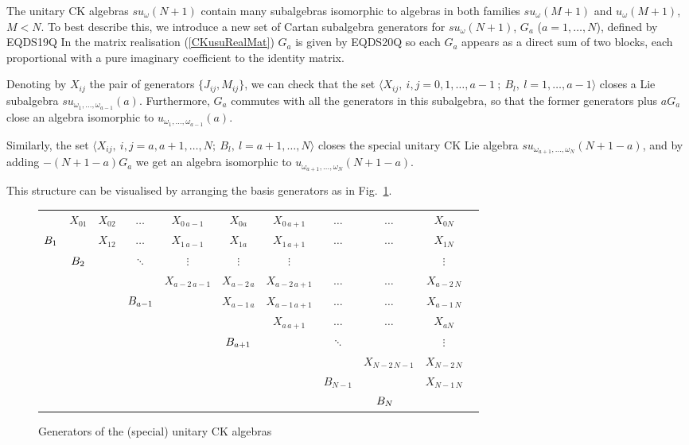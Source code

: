 \documentclass[12pt]{article}
\begin{document}
The  unitary CK algebras $su_{\omega}(N+1)$ contain many subalgebras
isomorphic to algebras in both families $su_{\omega}(M+1)$ and
$u_{\omega}(M+1)$, $M<N$. To best describe this,  we introduce a new set
of Cartan subalgebra generators for $su_{\omega}(N+1)$,
${G}_a$ ($a=1,\dots,N$), defined by
EQDS19Q
In the matrix realisation (\ref{CKusuRealMat}) ${G}_a$ is given by
EQDS20Q
so each ${G}_a$ appears as a direct sum of two blocks,
each proportional with a pure imaginary coefficient to the identity matrix.

Denoting by ${X}_{ij}$ the pair of generators
$\{{J}_{ij},{M}_{ij}\}$, we can check that the set $\langle
{X}_{ij},\ i,j=0,1,\dots,a-1\ ;\ {B}_l,\ l=1,\dots,a-1\rangle$
closes a Lie subalgebra
$su_{{\omega}_1,\dots,{\omega}_{a-1}}(a)$.
Furthermore,
${G}_a$ commutes with all the generators in this subalgebra, so that
the former generators plus $a{G}_a$ close an algebra isomorphic to
$u_{{\omega}_1,\dots,{\omega}_{a-1}}(a)$.

Similarly, the set $\langle {X}_{ij},\ i,j=a,a+1,\dots,N;\ {B}_l,\
l=a+1,\dots,N \rangle$ closes the  special unitary CK Lie algebra
$su_{{\omega}_{a+1},\dots,{\omega}_N}(N+1-a)$, and by adding $-(N+1-a){G}_a$ we
get an algebra isomorphic to $u_{{\omega}_{a+1},\dots,{\omega}_N}(N+1-a)$.

This structure can be visualised by arranging the basis generators
as in Fig.~\ref{fig2.1}.

\begin{figure}[ht]
\begin{center}
\begin{tabular}{ccccc|cccccc}
& ${X}_{01} $&$ {X}_{02} $&$\ldots$&${X}_{0\, a-1} $&
   ${X}_{0a}$&${X}_{0\, a+1}$&$\ldots$&$\ldots$&${X}_{0N}$\\
$\hfill {B}_{1} $ && $ {X}_{12} $&$\ldots$&${X}_{1\, a-1} $&
   ${X}_{1a}$&${X}_{1\, a+1}$& $\ldots$&$\ldots$&${X}_{1N}$\\
& $\hfill {B}_{2} $ &$  $&$\ddots $&$\vdots$&
   $\vdots$&$\vdots$&$ $&&$\vdots$\\
& &$ $&$ $&${X}_{a-2\,a-1}$&  ${X}_{a-2\,a}$&${X}_{a-2\,a+1}$&
  $\ldots$&$\ldots$&${X}_{a-2\,N}$\\
& &$ $& $\hfill {B}_{a-1}$ &&  ${X}_{a-1\,a}$&${X}_{a-1\,a+1}$&
   $\ldots$&$\ldots$&${X}_{a-1\,N}$\\
\cline{6-10}
& &$ $&\multicolumn{2}{c}{\,} $\hfill {G}_{a}\ \ \ \ $
   &&${X}_{a\,a+1}$& $\ldots$&$\ldots$&${X}_{a  N}$\\
& &$ $&\multicolumn{2}{c}{\,}&  $\hfill {B}_{a+1}$&
  $ $& $\ddots$&&$\vdots$\\
& &$ $&\multicolumn{2}{c}{\,}&  $ $&
  $ $ $  $&&${X}_{N-2\,N-1}$&${X}_{N-2\,N}$\\
& &$ $&\multicolumn{2}{c}{\,}&  $ $&
  $ $ &${B}_{N-1}$&&${X}_{N-1\,N}$\\
& &$ $&\multicolumn{2}{c}{\,}&  $ $& $ $ &&$\hfill {B}_{N}\ \ $\\
\end{tabular}
\end{center}
\caption{Generators of the (special) unitary CK algebras}
\label{fig2.1}
\end{figure}
\end{document}
